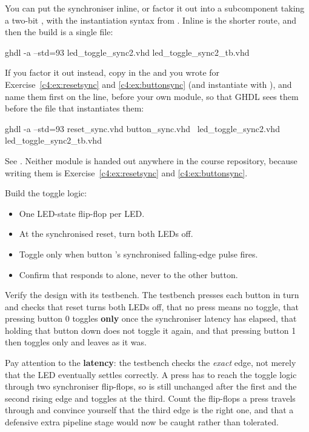 \note[Hint]You can put the synchroniser inline, or factor it out into a subcomponent taking a
two-bit , with the instantiation syntax from . Inline is
the shorter route, and then the build is a single file:

\begin{shell}
ghdl -a --std=93 led_toggle_sync2.vhd led_toggle_sync2_tb.vhd
\end{shell}

If you factor it out instead, copy in the  and  you wrote
for Exercise~\ref{c4:ex:resetsync} and \ref{c4:ex:buttonsync} (and instantiate 
with ), and name them first on the  line, before your own module, so
that GHDL sees them before the file that instantiates them:

\begin{shell}
ghdl -a --std=93 reset_sync.vhd button_sync.vhd \
                 led_toggle_sync2.vhd led_toggle_sync2_tb.vhd
\end{shell}

See . Neither module is handed out anywhere in the course repository,
because writing them is Exercise~\ref{c4:ex:resetsync} and \ref{c4:ex:buttonsync}.

 Build the toggle logic:
\begin{itemize}
  \item One LED-state flip-flop per LED.
  \item At the synchronised reset, turn both LEDs off.
  \item Toggle  only when button 's synchronised falling-edge pulse fires.
  \item Confirm that \code{led(i)} responds to \code{button_n(i)} alone, never to the other button.
\end{itemize}

 Verify the design with its testbench. The testbench presses each button in turn and checks
that reset turns both LEDs off, that no press means no toggle, that pressing button 0 toggles
\textbf{only} \code{led(0)} once the synchroniser latency has elapsed, that holding that button down
does not toggle it again, and that pressing button 1 then toggles only \code{led(1)} and leaves
\code{led(0)} as it was.

Pay attention to the \textbf{latency}: the testbench checks the \emph{exact} edge, not merely that
the LED eventually settles correctly. A press has to reach the toggle logic through two synchroniser
flip-flops, so \code{led} is still unchanged after the first and the second rising edge and toggles
at the third. Count the flip-flops a press travels through and convince yourself that the third edge
is the right one, and that a defensive extra pipeline stage would now be caught rather than
tolerated.

